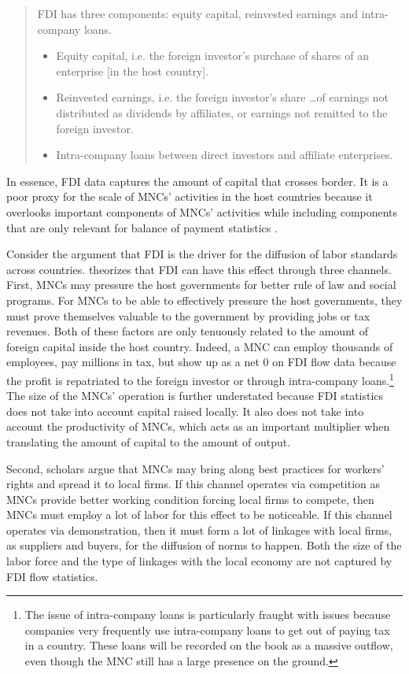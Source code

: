 \begin{quote} FDI has three components: equity capital, reinvested earnings and
intra-company loans.
\begin{itemize}
\item Equity capital, i.e. the foreign investor’s purchase of shares of an
enterprise [in the host country].
\item Reinvested earnings, i.e. the foreign investor’s share \ldots of earnings
not distributed as dividends by affiliates, or earnings not remitted to the
foreign investor.
  \item Intra-company loans between direct investors and affiliate enterprises.
\end{itemize} \citep[245]{UNCTAD2007}
\end{quote}

In essence, FDI data captures the amount of capital that crosses border. It is a
poor proxy for the scale of MNCs' activities in the host countries because it
overlooks important components of MNCs' activities while including components
that are only relevant for balance of payment statistics
\citep{Beugelsdijk2010}.

Consider the argument that FDI is the driver for the diffusion of labor
standards across countries. \citet{Mosley2007} theorizes that FDI can have this
effect through three channels. First, MNCs may pressure the host governments for
better rule of law and social programs. For MNCs to be able to effectively
pressure the host governments, they must prove themselves valuable to the
government by providing jobs or tax revenues. Both of these factors are only
tenuously related to the amount of foreign capital inside the host country.
Indeed, a MNC can employ thousands of employees, pay millions in tax, but show
up as a net 0 on FDI flow data because the profit is repatriated to the foreign
investor or through intra-company loans.\footnote{The issue of intra-company
loans is particularly fraught with issues because companies very frequently use
intra-company loans to get out of paying tax in a country. These loans will be
recorded on the book as a massive outflow, even though the MNC still has a large
presence on the ground.} The size of the MNCs' operation is further understated
because FDI statistics does not take into account capital raised locally. It
also does not take into account the productivity of MNCs, which acts as an
important multiplier when translating the amount of capital to the amount of
output.

Second, scholars argue that MNCs may bring along best practices for workers'
rights and spread it to local firms. If this channel operates via competition as
MNCs provide better working condition forcing local firms to compete, then MNCs
must employ a lot of labor for this effect to be noticeable. If this channel
operates via demonstration, then it must form a lot of linkages with local
firms, as suppliers and buyers, for the diffusion of norms to happen. Both the
size of the labor force and the type of linkages with the local economy are not
captured by FDI flow statistics.

